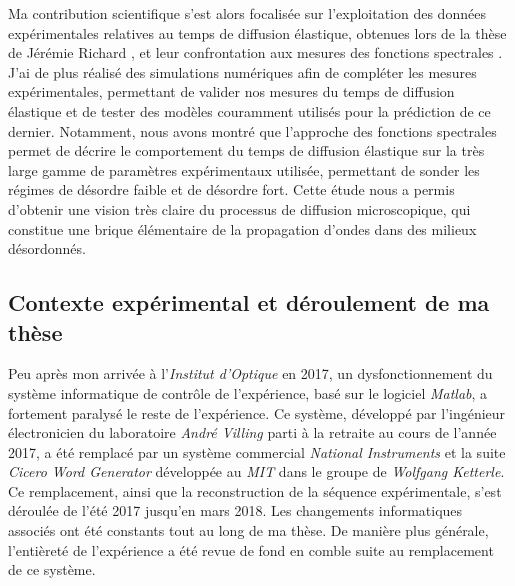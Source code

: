 Ma contribution scientifique s'est alors focalisée sur l'exploitation des données expérimentales relatives au temps de diffusion élastique, obtenues lors de la thèse de Jérémie Richard \citep{richard2015propagation}\citep{richard2019elastic}, et leur confrontation aux mesures des fonctions spectrales \citep{signoles2019ultracold}. J'ai de plus réalisé des simulations numériques afin de compléter les mesures expérimentales, permettant de valider nos mesures du temps de diffusion élastique et de tester des modèles couramment utilisés pour la prédiction de ce dernier. Notamment, nous avons montré que l'approche des fonctions spectrales permet de décrire le comportement du temps de diffusion élastique sur la très large gamme de paramètres expérimentaux utilisée, permettant de sonder les régimes de désordre faible et de désordre fort. Cette étude nous a permis d'obtenir une vision très claire du processus de diffusion microscopique, qui constitue une brique élémentaire de la propagation d'ondes dans des milieux désordonnés.






\subsection{Contexte expérimental et déroulement de ma thèse}
Peu après mon arrivée à l'\emph{Institut d'Optique} en 2017, un dysfonctionnement du système informatique de contrôle de l'expérience, basé sur le logiciel \emph{Matlab}, a fortement paralysé le reste de l'expérience. Ce système, développé par l'ingénieur électronicien du laboratoire \emph{André Villing} parti à la retraite au cours de l'année 2017, a été remplacé par un système commercial \emph{National Instruments} et la suite \emph{Cicero Word Generator} développée au \emph{MIT} dans le groupe de \emph{Wolfgang Ketterle}. Ce remplacement, ainsi que la reconstruction de la séquence expérimentale, s'est déroulée de l'été 2017 jusqu'en mars 2018. Les changements informatiques associés ont été constants tout au long de ma thèse. De manière plus générale, l'entièreté de l'expérience a été revue de fond en comble suite au remplacement de ce système.

